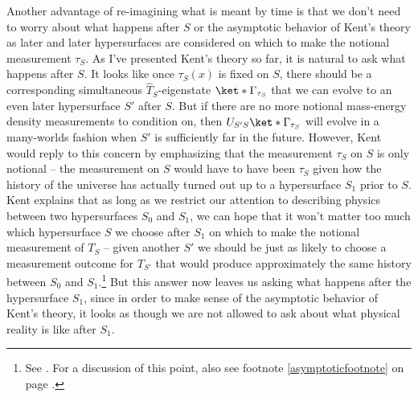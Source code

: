 \documentclass[12pt]{report}
\begin{document}
Another advantage of re-imagining what is meant by time is that we don't need to worry about what happens after $S$ or the asymptotic behavior of Kent's theory as later and later hypersurfaces are considered on which to make the notional measurement $\tau_S$. As I've presented Kent's theory so far, it is natural to ask what happens after $S$. It looks like once $\tau_S(x)$ is fixed on $S$, there should be a corresponding simultaneous $\hat{T}_S$-eigenstate $\ket*{\Gamma_{\tau_S}}$ %
%
that we can evolve to an even later hypersurface $S'$ after $S$. But if there are no more notional mass-energy density measurements to condition on, then $U_{S'S}\ket*{\Gamma_{\tau_S}}$ will evolve in a many-worlds fashion when $S'$ is sufficiently far in the future. However, Kent would reply to this concern by emphasizing that the measurement $\tau_S$ on $S$ is only notional -- the measurement on $S$ would have to have been $\tau_S$ given how the history of the universe has actually turned out up to a hypersurface $S_1$ prior to $S$. Kent explains that as long as we restrict our attention to describing physics between two hypersurfaces $S_0$ and $S_1$, we can hope that it won't matter too much which hypersurface $S$ we choose after $S_1$ on which to make the notional measurement of $T_S$ -- given another $S'$ we should be just as likely to choose a measurement outcome for $T_{S'}$ that would produce approximately the same history between $S_0$ and $S_1$.\footnote{See  \cite[3]{Kent2014}. For a discussion of this point, also see footnote \ref{asymptoticfootnote} on page \pageref{asymptoticfootnote}.} But this answer now leaves us asking what happens after the hypersurface $S_1$, since in order to make sense of the asymptotic behavior of Kent's theory, it looks as though we are not allowed to ask about what physical reality is like after $S_1$.  
\end{document}
